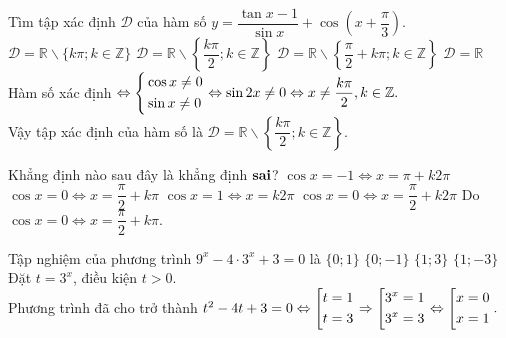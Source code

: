 \begin{ex}%
Tìm tập xác định $\mathscr{D}$ của hàm số $y= \dfrac{\tan x-1}{\sin x}+\cos \left( x+\dfrac{\pi}{3}\right)$.
\choice
{$\mathscr{D} = \mathbb{R} \backslash  \{k \pi; k \in \mathbb{Z} \}$}
{\True $\mathscr{D} = \mathbb{R} \backslash  \left\{\dfrac{k \pi}{2}; k \in \mathbb{Z} \right\}$}
{$\mathscr{D} = \mathbb{R} \backslash  \left\{\dfrac{\pi}{2} +k \pi; k \in \mathbb{Z} \right\}$}
{$\mathscr{D} = \mathbb{R}$}
\loigiai
{ Hàm số xác định $\Leftrightarrow \left\{\begin{aligned}& \cos x \neq 0\\& \sin x \neq 0\end{aligned}\right. \Leftrightarrow \sin {2x} \neq 0 \Leftrightarrow x \neq \dfrac{k \pi}{2}, k\in \mathbb{Z}.$ \\
Vậy tập xác định của hàm số là $\mathscr{D} = \mathbb{R} \backslash  \left\{\dfrac{k \pi}{2}; k \in \mathbb{Z} \right\}$.
}
\end{ex}
\begin{ex}%
Khẳng định nào sau đây là khẳng định $\bf {sai}$?
\choice
{$ \cos x=-1 \Leftrightarrow x= \pi +k2 \pi$}
{$\cos x =0 \Leftrightarrow x= \dfrac{\pi}{2}+k \pi$ }
{$\cos x=1 \Leftrightarrow x=k2 \pi$}
{\True $ \cos x=0 \Leftrightarrow x= \dfrac{\pi}{2}+k2 \pi$}
\loigiai
{
Do $ \cos x=0 \Leftrightarrow x= \dfrac{\pi}{2}+k \pi.$
}
\end{ex}
\begin{ex}%
Tập nghiệm của phương trình $9^x-4 \cdot 3^x+3=0$ là
\choice
{\True $\{ 0;1 \}$}
{$\{ 0;-1 \}$}
{$\{ 1;3 \}$}
{$\{ 1;-3 \}$}
\loigiai
{
Đặt $t=3^x$, điều kiện $t>0$. \\
Phương trình đã cho trở thành $t^2-4t+3=0 \Leftrightarrow \left[\begin{aligned}& t=1\\& t=3\end{aligned}\right. \Rightarrow \left[\begin{aligned}&3^x=1\\&3^x=3\end{aligned}\right. \Leftrightarrow \left[\begin{aligned}&x=0\\&x=1\end{aligned}\right..$  
}
\end{ex}

